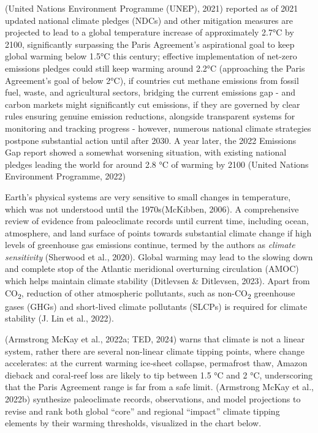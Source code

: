 \documentclass[
  12pt,
  letterpaper,
  DIV=11,
  numbers=noendperiod]{scrartcl}
\begin{document}
(United Nations Environment Programme (UNEP), 2021) reported as of 2021
updated national climate pledges (NDCs) and other mitigation measures
are projected to lead to a global temperature increase of approximately
2.7°C by 2100, significantly surpassing the Paris Agreement's
aspirational goal to keep global warming below 1.5°C this century;
effective implementation of net-zero emissions pledges could still keep
warming around 2.2°C (approaching the Paris Agreement's goal of below
2°C), if countries cut methane emissions from fossil fuel, waste, and
agricultural sectors, bridging the current emissions gap - and carbon
markets might significantly cut emissions, if they are governed by clear
rules ensuring genuine emission reductions, alongside transparent
systems for monitoring and tracking progress - however, numerous
national climate strategies postpone substantial action until after
2030. A year later, the 2022 Emissions Gap report showed a somewhat
worsening situation, with existing national pledges leading the world
for around 2.8 °C of warming by 2100 (United Nations Environment
Programme, 2022)

Earth's physical systems are very sensitive to small changes in
temperature, which was not understood until the 1970s(McKibben, 2006). A
comprehensive review of evidence from paleoclimate records until current
time, including ocean, atmosphere, and land surface of points towards
substantial climate change if high levels of greenhouse gas emissions
continue, termed by the authors as \emph{climate sensitivity} (Sherwood
et al., 2020). Global warming may lead to the slowing down and complete
stop of the Atlantic meridional overturning circulation (AMOC) which
helps maintain climate stability (Ditlevsen \& Ditlevsen, 2023). Apart
from CO\textsubscript{2}, reduction of other atmospheric pollutants,
such as non-CO\textsubscript{2} greenhouse gases (GHGs) and short-lived
climate pollutants (SLCPs) is required for climate stability (J. Lin et
al., 2022).

(Armstrong McKay et al., 2022a; TED, 2024) warns that climate is not a
linear system, rather there are several non-linear climate tipping
points, where change accelerates: at the current warming ice‐sheet
collapse, permafrost thaw, Amazon dieback and coral‐reef loss are likely
to tip between 1.5 °C and 2 °C, underscoring that the Paris Agreement
range is far from a safe limit. (Armstrong McKay et al., 2022b)
synthesize paleoclimate records, observations, and model projections to
revise and rank both global ``core'' and regional ``impact'' climate
tipping elements by their warming thresholds, visualized in the chart
below.
\end{document}
